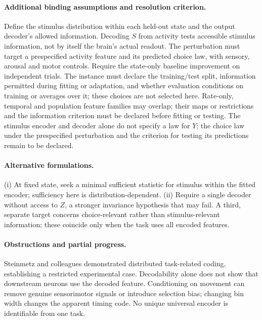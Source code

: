 \documentclass[11pt]{article}
\begin{document}
\paragraph{Additional binding assumptions and resolution criterion.} Define the stimulus distribution within each held-out state and the output decoder's allowed information. Decoding $S$ from activity tests accessible stimulus information, not by itself the brain's actual readout. The perturbation must target a prespecified activity feature and its predicted choice law, with sensory, arousal and motor controls. Require the state-only baseline improvement on independent trials. The instance must declare the training/test split, information permitted during fitting or adaptation, and whether evaluation conditions on training or averages over it; these choices are not selected here. Rate-only, temporal and population feature families may overlap; their maps or restrictions and the information criterion must be declared before fitting or testing. The stimulus encoder and decoder alone do not specify a law for $Y$; the choice law under the prespecified perturbation and the criterion for testing its predictions remain to be declared.

\paragraph{Alternative formulations.} (i) At fixed state, seek a minimal sufficient statistic for stimulus within the fitted encoder; sufficiency here is distribution-dependent. (ii) Require a single decoder without access to $Z$, a stronger invariance hypothesis that may fail. A third, separate target concerns choice-relevant rather than stimulus-relevant information; these coincide only when the task uses all encoded features.
\paragraph{Obstructions and partial progress.} Steinmetz and colleagues demonstrated distributed task-related coding, establishing a restricted experimental case. Decodability alone does not show that downstream neurons use the decoded feature. Conditioning on movement can remove genuine sensorimotor signals or introduce selection bias; changing bin width changes the apparent timing code. No unique universal encoder is identifiable from one task.
\end{document}
